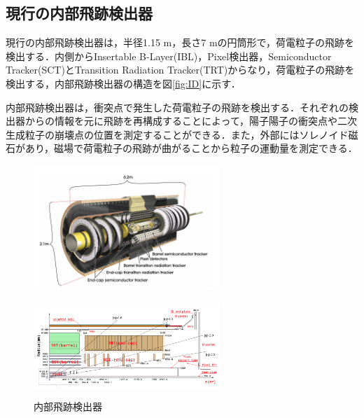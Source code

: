 \subsection{現行の内部飛跡検出器}
現行の内部飛跡検出器は，半径1.15 $\mathrm{m}$，長さ7 $\mathrm{m}$の円筒形で，荷電粒子の飛跡を検出する．内側からInsertable B-Layer(IBL)，Pixel検出器，Semiconductor Tracker(SCT)とTransition Radiation Tracker(TRT)からなり，荷電粒子の飛跡を検出する，内部飛跡検出器の構造を図\ref{fig:ID}に示す．\par
内部飛跡検出器は，衝突点で発生した荷電粒子の飛跡を検出する．それぞれの検出器からの情報を元に飛跡を再構成することによって，陽子陽子の衝突点や二次生成粒子の崩壊点の位置を測定することができる．また，外部にはソレノイド磁石があり，磁場で荷電粒子の飛跡が曲がることから粒子の運動量を測定できる．\par


\begin{figure}[h]
  \centering
  \begin{minipage}[b]{0.4\linewidth}
    \centering
    \includegraphics[width=7cm]{./figure/ID.png}
    \label{fig:ID}
  \end{minipage}
  \begin{minipage}[b]{0.4\linewidth}
    \centering
    \includegraphics[width=7cm]{./figure/pixelview.png}
    \label{fig:IDview}
  \end{minipage}
  \caption{内部飛跡検出器\cite{Collaboration_2008}}
\end{figure}


